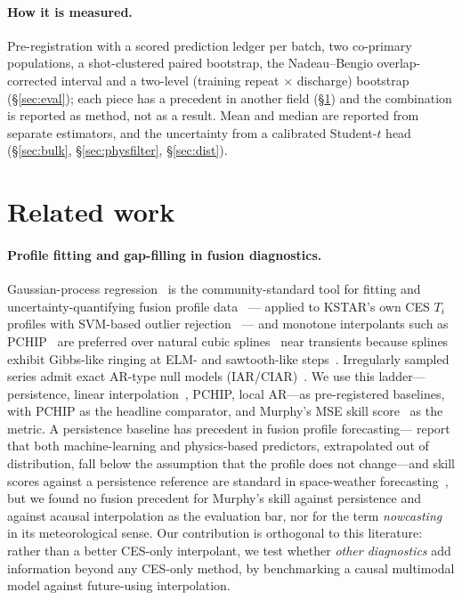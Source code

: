 \documentclass[10pt]{article}
\newcommand{\Ti}{\ensuremath{T_i}}
\begin{document}
\paragraph{How it is measured.} Pre-registration with a scored prediction ledger per
batch, two co-primary populations, a shot-clustered paired bootstrap, the
Nadeau--Bengio overlap-corrected interval and a two-level (training repeat $\times$
discharge) bootstrap (\S\ref{sec:eval}); each piece has a precedent in another field
(\S\ref{sec:related}) and the combination is reported as method, not as a result.
Mean and median are reported from separate estimators, and the uncertainty from a
calibrated Student-$t$ head (\S\ref{sec:bulk}, \S\ref{sec:physfilter},
\S\ref{sec:dist}).

\section{Related work}
\label{sec:related}

\paragraph{Profile fitting and gap-filling in fusion diagnostics.}
Gaussian-process regression~\citep{rasmussen2006} is the community-standard tool
for fitting and uncertainty-quantifying fusion profile
data~\citep{chilenski2015,michoski2024} --- applied to KSTAR's own CES \Ti{}
profiles with SVM-based outlier rejection~\citep{Kim2024KineticProfile} --- and
monotone interpolants such as
PCHIP~\citep{fritsch1980,dougherty1989} are preferred over natural cubic
splines~\citep{reinsch1967} near transients because splines exhibit Gibbs-like
ringing at ELM- and sawtooth-like steps~\citep{kvernadze1998}. Irregularly
sampled series admit exact AR-type null models
(IAR/CIAR)~\citep{eyheramendy2018,elorrieta2019}. We use this
ladder---persistence, linear interpolation~\citep{press2007}, PCHIP, local
AR---as pre-registered baselines, with PCHIP as
the headline comparator, and Murphy's MSE skill score~\citep{murphy1988} as the
metric. A persistence baseline has precedent in fusion profile
forecasting---\citet{Abbate2025Combining} report that both machine-learning and
physics-based predictors, extrapolated out of distribution, fall below the
assumption that the profile does not change---and skill scores against a persistence
reference are standard in space-weather forecasting~\citep{Owens2013Persistence}, but
we found no fusion precedent for Murphy's skill against persistence and against
acausal interpolation as the evaluation bar, nor for the term \emph{nowcasting} in
its meteorological sense. Our contribution is orthogonal to this literature: rather than a better
CES-only interpolant, we test whether \emph{other diagnostics} add information
beyond any CES-only method, by benchmarking a causal multimodal model against
future-using interpolation.
\end{document}
